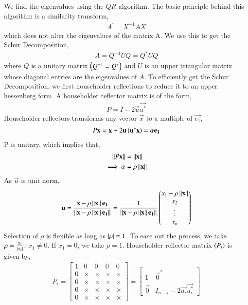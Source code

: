 \documentclass[journal]{IEEEtran}
\begin{document}
We find the eigenvalues using the $QR$ algorithm. The basic principle behind this algorithm is a similarity transform,
\begin{align}
  A^{\prime} = X^{-1}AX
\end{align}
which does not alter the eigenvalues of the matrix A. 
\newline
We use this to get the Schur Decomposition,
\begin{align}
  A = Q^{-1}UQ = Q^{\ast}UQ
\end{align}
where $Q$ is a unitary matrix $\left(Q^{-1} = Q^{\ast}\right)$ and $U$ is an upper triangular matrix whose diagonal entries are the eigenvalues of $A$.
\newline
To efficiently get the Schur Decomposition, we first householder reflections to reduce it to an upper hessenberg form.
\newline
A householder reflector matrix is of the form,
\begin{align}
  P = I - 2\vec{u}\vec{u^{\ast}}
\end{align}
Householder reflectors transforms any vector $\vec{x}$ to a multiple of $\vec{e_1}$,
\begin{align}
  P\mathbf{x} = \mathbf{x} - 2\mathbf{u}\left(\mathbf{u^{\ast}}\mathbf{x}\right) = \alpha \mathbf{e_1}
\end{align}
P is unitary, which implies that,
\begin{align}
  \left\lVert P\mathbf{x}\right\rVert &= \left\lVert\mathbf{x}\right\rVert\\
  \implies \alpha &= \rho\left\lVert\mathbf{x}\right\rVert\\
\end{align}
As $\vec{u}$ is unit norm,
\begin{align}
  \mathbf{u} = \frac{\mathbf{x} - \rho\left\lVert\mathbf{x}\right\rVert\mathbf{e_1}}{\left\lVert\mathbf{x} - \rho\left\lVert\mathbf{x}\right\rVert\mathbf{e_1}\right\rVert} = \frac{1}{\left\lVert\mathbf{x} - \rho\left\lVert\mathbf{x}\right\rVert\mathbf{e_1}\right\rVert} \begin{pmatrix} x_1 - \rho\left\lVert\mathbf{x}\right\rVert\\x_2\\\vdots\\x_n\end{pmatrix}
\end{align}
Selection of $\rho$ is flexible as long as $\left\vert\rho\right\vert = 1$. To ease out the process, we take $\rho = \frac{x_1}{\left\vert x_1\right\vert}$, $x_1 \neq 0$. If $x_1 = 0$, we take $\rho = 1$.
\newline
Householder reflector matrix $\left(P_{i}\right)$ is given by,
\begin{align}
  P_{i} = \begin{bmatrix}
    1 & 0 & 0 & 0 & 0\\    
    0 & \times & \times & \times & \times\\
    0 & \times & \times & \times & \times\\
    0 & \times & \times & \times & \times\\
    0 & \times & \times & \times & \times
  \end{bmatrix} = \begin{bmatrix}
    1 & \vec{0}^{\ast}\\    
    \vec{0} & I_{n - i} - 2\vec{u_{i}}\vec{u_{i}^{\ast}}
  \end{bmatrix}
\end{align}
\end{document}
